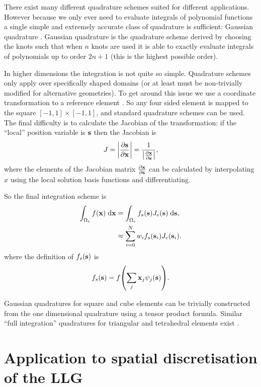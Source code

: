 There exist many different quadrature schemes suited for different applications.
However because we only ever need to evaluate integrals of polynomial functions a single simple and extremely accurate class of quadrature is sufficient: Gaussian quadrature \cite[492]{Kincaid2002}.
Gaussian quadrature is the quadrature scheme derived by choosing the knots such that when $n$ knots are used it is able to exactly evaluate integrals of polynomials up to order $2n + 1$ (this is the highest possible order).

In higher dimensions the integration is not quite so simple.
Quadrature schemes only apply over specifically shaped domains (or at least must be non-trivially modified for alternative geometries).
To get around this issue we use a coordinate transformation to a reference element \cite[29]{HowardElmanDavidSilvester2006}.
So \eg any four sided element is mapped to the square $[-1, 1] \times [-1, 1]$, and standard quadrature schemes can be used.
The final difficulty is to calculate the Jacobian of the transformation: if the ``local'' position variable is $\sv$ then the Jacobian is
\begin{equation}
  J = \abs{ \pd{\sv}{\xv}} = \frac{1}{\abs{\pd{\xv}{\sv}}},
\end{equation}
where the elements of the Jacobian matrix $\pd{\xv}{\sv}$ can be calculated by interpolating $x$ using the local solution basis functions and differentiating.

So the final integration scheme is
\begin{equation}
  \begin{aligned}
    \intdx[\magd_e]{f(\xv)} &= \intds[\magd_e]{f_s(\sv) J_e(\sv)}, \\
    &\approx  \sum_{i=0}^N w_i f_s(\sv_i) J_e(\sv_i).
  \end{aligned}
\end{equation}
where the definition of $f_s(\sv)$ is
\begin{equation}
  f_s(\sv) = f\bigb{\sum_j  \xv_j \sbf_j(\sv)}.
\end{equation}

Gaussian quadratures for square and cube elements can be trivially constructed from the one dimensional quadrature using a tensor product formula.
Similar ``full integration'' quadratures for triangular and tetrahedral elements exist \eg \cite{oomph-lib-integral.cc}.




\section{Application to spatial discretisation of the LLG}
\label{sec:llg-initial-equations}

